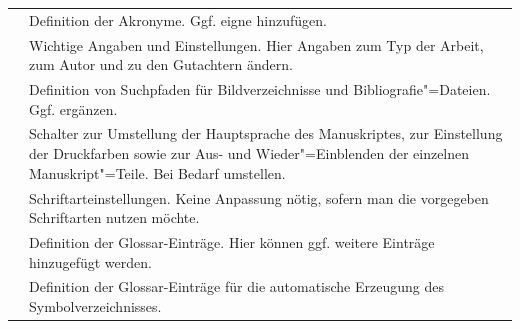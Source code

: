 \begin{longtable}{l@{\extracolsep{8pt}}x}
          & Definition der Akronyme.
                                                 Ggf. eigne hinzufügen.\\
       & Wichtige Angaben und Einstellungen.
                                                 Hier Angaben zum Typ der Arbeit, zum Autor und zu den Gutachtern ändern.\\
         & Definition von Suchpfaden für Bildverzeichnisse und Bibliografie"=Dateien.
                                                 Ggf. ergänzen.\\
      & Schalter zur Umstellung der Hauptsprache des Manuskriptes,
                                                 zur Einstellung der Druckfarben sowie zur
                                                 Aus- und Wieder"=Einblenden der einzelnen Manuskript"=Teile.
                                                 Bei Bedarf umstellen.\\
   & Schriftarteinstellungen.
                                                 Keine Anpassung nötig, sofern man die vorgegeben Schriftarten nutzen möchte.\\
          & Definition der Glossar-Einträge. 
                                                 Hier können ggf. weitere Einträge hinzugefügt werden.\\
   & Definition der Glossar-Einträge für die automatische Erzeugung des Symbolverzeichnisses.

\end{longtable}
